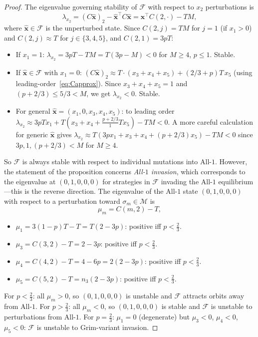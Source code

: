 \documentclass[12pt,a4paper]{article}
\begin{document}
\begin{proof}
The eigenvalue governing stability of $\mathcal{F}$ with respect to $x_2$
perturbations is
\[
  \lambda_{x_2} = (C\hat{\mathbf{x}})_2 - \hat{\mathbf{x}}^\top C\hat{\mathbf{x}}
  = \mathbf{x}^\top C(2,\cdot) - TM,
\]
where $\hat{\mathbf{x}}\in\mathcal{F}$ is the unperturbed state.  Since
$C(2,j)=TM$ for $j=1$ (if $x_1>0$) and $C(2,j)\approx T$ for
$j\in\{3,4,5\}$, and $C(2,1)=3pT$:

\begin{itemize}
  \item If $x_1=1$: $\lambda_{x_2}=3pT-TM=T(3p-M)<0$ for $M\geq 4$, $p\leq 1$. Stable.
  \item If $\hat{\mathbf{x}}\in\mathcal{F}$ with $x_1=0$: 
        $(C\hat{\mathbf{x}})_2\approx T\cdot(x_3+x_4+x_5)+(2/3+p)T\,x_5$
        (using leading-order~\eqref{eq:Capprox}).
        Since $x_3+x_4+x_5=1$ and $(p+2/3)\leq 5/3<M$, we get
        $\lambda_{x_2}<0$. Stable.
  \item For general $\hat{\mathbf{x}}=(x_1,0,x_3,x_4,x_5)$:
        to leading order $\lambda_{x_2}\approx 3pTx_1+T(x_3+x_4+\tfrac{p+2/3}{1}Tx_5)-TM<0$.
        A more careful calculation for generic $\hat{\mathbf{x}}$ gives
        $\lambda_{x_2}\approx T(3px_1+x_3+x_4+(p+2/3)x_5)-TM<0$ since
        $3p,1,(p+2/3)<M$ for $M\geq 4$.
\end{itemize}

So $\mathcal{F}$ is always stable with respect to individual mutations into
All-$1$.  However, the statement of the proposition concerns \emph{All-$1$
invasion}, which corresponds to the eigenvalue at $(0,1,0,0,0)$ for strategies
in $\mathcal{F}$ invading the All-$1$ equilibrium---this is the reverse
direction.  The eigenvalue of the All-$1$ state $(0,1,0,0,0)$ with respect
to a perturbation toward $\sigma_m\in\mathcal{M}$ is
\[
  \mu_m = C(m,2) - T,
\]
\begin{itemize}
  \item $\mu_1 = 3(1-p)T-T = T(2-3p)$: positive iff $p<\tfrac{2}{3}$.
  \item $\mu_3 = C(3,2)-T = 2-3p$: positive iff $p<\tfrac{2}{3}$.
  \item $\mu_4 = C(4,2)-T = 4-6p = 2(2-3p)$: positive iff $p<\tfrac{2}{3}$.
  \item $\mu_5 = C(5,2)-T = n_3(2-3p)$: positive iff $p<\tfrac{2}{3}$.
\end{itemize}
For $p<\tfrac{2}{3}$: all $\mu_m>0$, so $(0,1,0,0,0)$ is unstable and
$\mathcal{F}$ attracts orbits away from All-$1$.
For $p>\tfrac{2}{3}$: all $\mu_m<0$, so $(0,1,0,0,0)$ is stable and
$\mathcal{F}$ is unstable to perturbations from All-$1$.
For $p=\tfrac{2}{3}$: $\mu_1=0$ (degenerate) but $\mu_3<0$, $\mu_4<0$,
$\mu_5<0$: $\mathcal{F}$ is unstable to Grim-variant invasion.
\end{proof}
\end{document}
